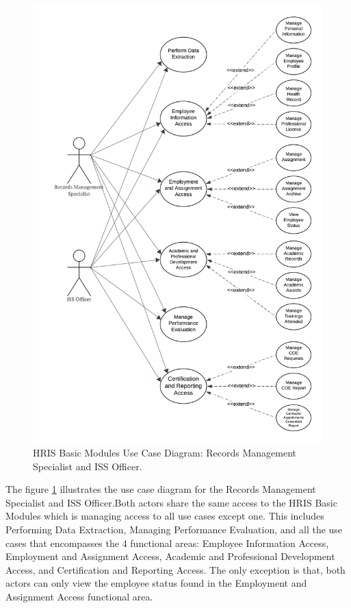     \begin{figure}[H]
        \centering
        \includegraphics[width=0.9\linewidth]{figures/images/diagrams/usecase/use-case-basic-4.png}
        \caption{HRIS Basic Modules Use Case Diagram: Records Management Specialist and ISS Officer.}
        \label{fig:use-case-basic-4}
    \end{figure}

    The figure \ref{fig:use-case-basic-4} illustrates the use case diagram for the Records Management Specialist and ISS Officer.Both actors share the same access to the HRIS Basic Modules which is managing access to all use cases except one. This includes Performing Data Extraction, Managing Performance Evaluation, and all the use cases that encompasses the 4 functional areas: Employee Information Access, Employment and Assignment Access, Academic and Professional Development Access, and Certification and Reporting Access. The only exception is that, both actors can only view the employee status found in the Employment and Assignment Access functional area.

